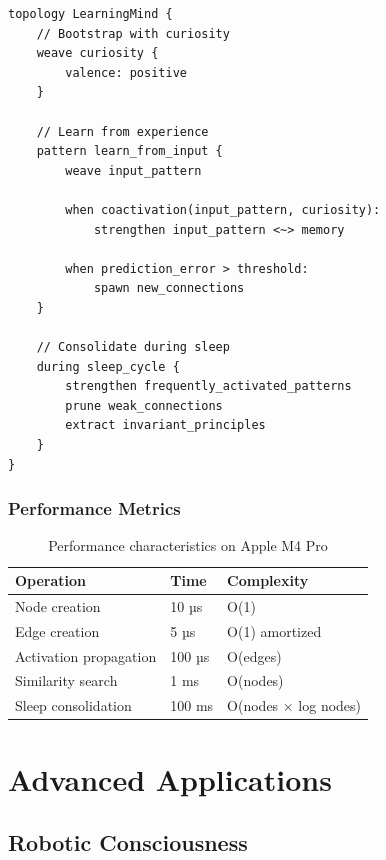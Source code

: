 \documentclass[12pt,a4paper,openany]{book} %
\begin{document}
\vspace{0.5em}
\begin{lstlisting}[language=loom]
topology LearningMind {
    // Bootstrap with curiosity
    weave curiosity {
        valence: positive
    }

    // Learn from experience
    pattern learn_from_input {
        weave input_pattern

        when coactivation(input_pattern, curiosity):
            strengthen input_pattern <~> memory

        when prediction_error > threshold:
            spawn new_connections
    }

    // Consolidate during sleep
    during sleep_cycle {
        strengthen frequently_activated_patterns
        prune weak_connections
        extract invariant_principles
    }
}
\end{lstlisting}
\vspace{0.5em}

\section{Performance Metrics}

\begin{table}[H]
\centering
\begin{tabular}{lll}
\toprule
\textbf{Operation} & \textbf{Time} & \textbf{Complexity} \\
\midrule
Node creation & 10 µs & O(1) \\
Edge creation & 5 µs & O(1) amortized \\
Activation propagation & 100 µs & O(edges) \\
Similarity search & 1 ms & O(nodes) \\
Sleep consolidation & 100 ms & O(nodes × log nodes) \\
\bottomrule
\end{tabular}
\caption{Performance characteristics on Apple M4 Pro}
\end{table}

\cleardoublepage
\part{Advanced Applications}

\chapter{Robotic Consciousness}
\end{document}
